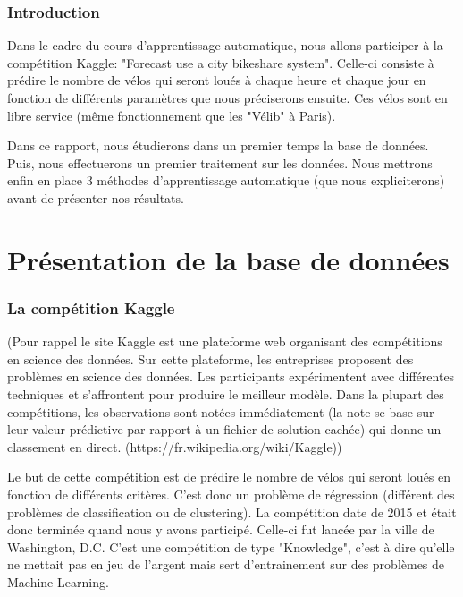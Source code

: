\documentclass[a4paper,oneside,11pt]{article}
\begin{document}
\section*{Introduction}
%

\qquad Dans le cadre du cours d'apprentissage automatique, nous allons participer à la compétition Kaggle: "Forecast use a city bikeshare system". Celle-ci consiste à prédire le nombre de vélos qui seront loués à chaque heure et chaque jour en fonction de différents paramètres que nous préciserons ensuite. Ces vélos sont en libre service (même fonctionnement que les "Vélib" à Paris).
	
\qquad Dans ce rapport, nous étudierons dans un premier temps la base de données. Puis, nous effectuerons un premier traitement sur les données. Nous mettrons enfin en place 3 méthodes d'apprentissage automatique (que nous expliciterons) avant de présenter nos résultats.   
\newpage
\part{    \textbf{Présentation de la base de données}}
\section*{La compétition Kaggle}
%

(Pour rappel le site Kaggle est une plateforme web organisant des compétitions en science des données. Sur cette plateforme, les entreprises proposent des problèmes en science des données. Les participants expérimentent avec différentes techniques et s'affrontent pour produire le meilleur modèle. Dans la plupart des compétitions, les observations sont notées immédiatement (la note se base sur leur valeur prédictive par rapport à un fichier de solution cachée) qui donne un classement en direct. (https://fr.wikipedia.org/wiki/Kaggle))

\qquad Le but de cette compétition est de prédire le nombre de vélos qui seront loués en fonction de différents critères. C'est donc un problème de régression (différent des problèmes de classification ou de clustering). La compétition date de 2015 et était donc terminée quand nous y avons participé. Celle-ci fut lancée par la ville de Washington, D.C. C'est une compétition de type "Knowledge", c'est à dire qu'elle ne mettait pas en jeu de l'argent mais sert d'entrainement sur des problèmes de Machine Learning.
\end{document}
